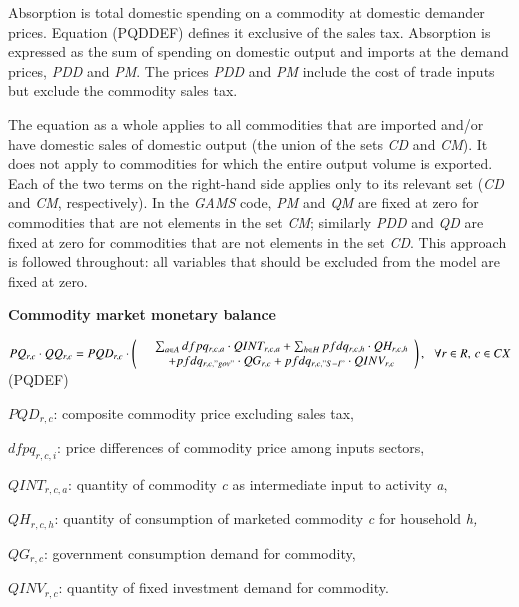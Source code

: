 \documentclass[10pt,a4paper,titlepage,dvipdfmx]{book}
\begin{document}
Absorption is total domestic spending on a commodity at domestic demander prices. Equation (PQDDEF) defines it exclusive of the sales tax. Absorption is expressed as the sum of spending on domestic output and imports at the demand prices, \textit{PDD} and \textit{PM}. The prices \textit{PDD} and \textit{PM} include the cost of trade inputs but exclude the commodity sales tax.

The equation as a whole applies to all commodities that are imported and/or have domestic sales of domestic output (the union of the sets \textit{CD} and \textit{CM}). It does not apply to commodities for which the entire output volume is exported. Each of the two terms on the right-hand side applies only to its relevant set (\textit{CD} and \textit{CM}, respectively). In the \textit{GAMS} code, \textit{PM} and \textit{QM} are fixed at zero for commodities that are not elements in the set \textit{CM}; similarly \textit{PDD} and \textit{QD} are fixed at zero for commodities that are not elements in the set \textit{CD}. This approach is followed throughout: all variables that should be excluded from the model are fixed at zero. 

\begin{flushleft}\textbf{Commodity market monetary balance}\end{flushleft}


\begin{center}$PQ_{r,c}\cdot QQ_{r,c}=PQD_{r,c}\cdot \left(\begin{array}{cc} & \sum _{a\in A}dfpq_{r,c,a}\cdot QINT_{r,c,a}+\sum _{h\in H}pfdq_{r,c,h}\cdot QH_{r,c,h}\\ & +pfdq_{r,c,"gov"}\cdot QG_{r,c}+pfdq_{r,c,"S-I"}\cdot QINV_{r,c}
\end{array}\right),\,\,\,\,\forall r\in R,\,c\in CX$ (PQDEF)
\end{center}

\begin{flushleft}
$PQD_{r,c}$: composite commodity price excluding sales tax,

$dfpq_{r,c,i}$: price differences of commodity price among inputs sectors,

$QINT_{r,c,a}$: quantity of commodity \textit{c} as intermediate input to activity \textit{a},

$QH_{r,c,h}$: quantity of consumption of marketed commodity \textit{c} for household \textit{h,}

$QG_{r,c}$: government consumption demand for commodity,

$QINV_{r,c}$: quantity of fixed investment demand for commodity.
\end{flushleft}
\end{document}
